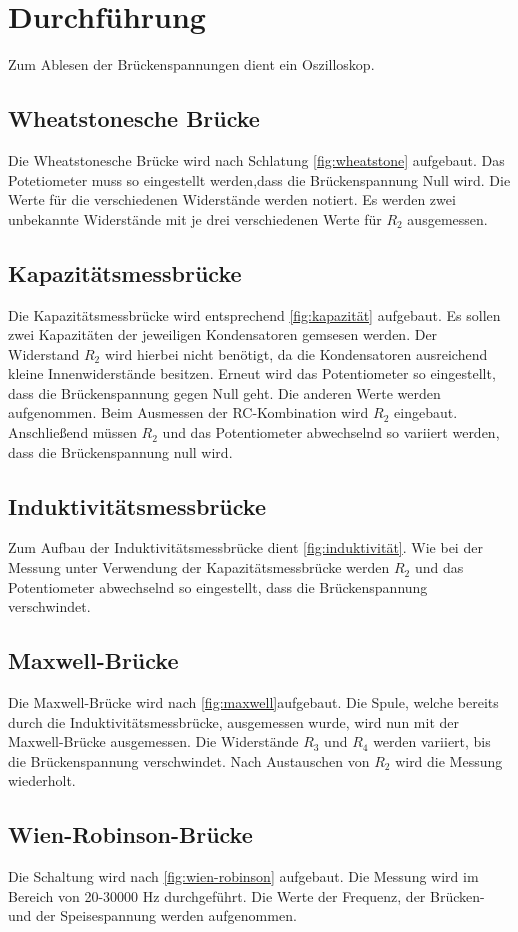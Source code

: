 \section{Durchführung}
\label{sec:Durchführung}

Zum Ablesen der Brückenspannungen dient ein Oszilloskop.

\subsection{Wheatstonesche Brücke}
Die Wheatstonesche Brücke wird nach Schlatung \ref{fig:wheatstone} aufgebaut. Das Potetiometer muss so eingestellt werden,dass die Brückenspannung Null wird. Die Werte für die verschiedenen Widerstände werden notiert. Es werden zwei unbekannte Widerstände mit je drei verschiedenen Werte für $R_{2}$ ausgemessen.

\subsection{Kapazitätsmessbrücke}
Die Kapazitätsmessbrücke wird entsprechend \ref{fig:kapazität} aufgebaut. Es sollen zwei Kapazitäten der jeweiligen Kondensatoren gemsesen werden.
Der Widerstand $R_{2}$ wird hierbei nicht benötigt, da die Kondensatoren ausreichend kleine Innenwiderstände besitzen. Erneut wird das Potentiometer so eingestellt, dass die Brückenspannung gegen Null geht. Die anderen Werte werden aufgenommen.
Beim Ausmessen der RC-Kombination wird $R_{2}$ eingebaut. Anschließend müssen $R_{2}$ und das Potentiometer abwechselnd so variiert werden, dass die Brückenspannung null wird.

\subsection{Induktivitätsmessbrücke}
 Zum Aufbau der Induktivitätsmessbrücke dient \ref{fig:induktivität}. Wie bei der Messung unter Verwendung der Kapazitätsmessbrücke werden $R_{2}$ und das Potentiometer abwechselnd so eingestellt, dass die Brückenspannung verschwindet.

\subsection{Maxwell-Brücke}
Die Maxwell-Brücke wird nach \ref{fig:maxwell}aufgebaut. Die Spule, welche bereits durch die Induktivitätsmessbrücke, ausgemessen wurde, wird nun mit der Maxwell-Brücke ausgemessen. Die Widerstände $R_3$ und $R_4$ werden variiert, bis die Brückenspannung verschwindet. Nach Austauschen von $R_{2}$ wird die Messung wiederholt.

\subsection{Wien-Robinson-Brücke}
Die Schaltung wird nach \ref{fig:wien-robinson} aufgebaut. Die Messung wird im Bereich von 20-30000 \si{\Hz} durchgeführt. Die Werte der Frequenz, der Brücken- und der Speisespannung werden aufgenommen.
